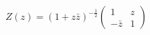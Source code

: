 \begin{equation}
Z(z) = (1+z \bar{z})^{-\frac{1}{2}} \left(
\begin{array}{cc}
1 & z \\
-\bar{z} & 1
\end{array}
\right)
\end{equation}

